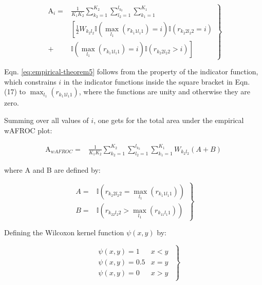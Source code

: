 \documentclass[
]{book}
\begin{document}
\begin{equation}
\left. 
\begin{aligned}
\text{A}_i =& \frac{1}{K_1K_2}  \sum_{k_2=1}^{K_2} \sum_{l_2=1}^{l_{k_2}}\sum_{k_1=1}^{K_1} \\
&\left [ \frac{1}{2} W_{k_2l_2} \mathbb{I}\left ( \max_{l_1} \left (r_{k_1 1 l_1 1}  \right ) = i  \right )\mathbb{I}\left ( r_{k_2 2 l_2 2} = i\right ) \right. \\
+& \left. \mathbb{I}\left ( \max_{l_1} \left (r_{k_1 1 l_1 1}  \right ) = i  \right )\mathbb{I}\left ( r_{k_2 2 l_2 2} > i \right )  \right ]
\end{aligned}
\right \} 
\label{eq:empirical-theorem5}
\end{equation}

Eqn. \eqref{eq:empirical-theorem5} follows from the property of the indicator function, which constrains \(i\) in the indicator functions inside the square bracket in Eqn. (17) to \(\max_{l_1} \left ( r_{k_1 1 l_1 1} \right )\), where the functions are unity and otherwise they are zero.

Summing over all values of \(i\), one gets for the total area under the empirical wAFROC plot:

\begin{equation}
\begin{aligned}
\text{A}_{wAFROC} =& \frac{1}{K_1K_2}  \sum_{k_2=1}^{K_2} \sum_{l_2=1}^{l_{k_2}}\sum_{k_1=1}^{K_1} W_{k_2l_2} \left( A+B \right)
\end{aligned}
\label{eq:empirical-theorem6}
\end{equation}

where A and B are defined by:

\begin{equation}
\left. 
\begin{aligned}
A =& \mathbb{I}\left ( r_{k_2 2l_2 2} = \max_{l_1} \left (r_{k_1 1l_1 1}  \right )  \right ) \\
B =& \mathbb{I}\left ( r_{k_22 l_2 2} > \max_{l_1} \left (r_{k_11 l_1 1}  \right )  \right )  
\end{aligned}
\right \} 
\label{eq:empirical-theorem6a}
\end{equation}

Defining the Wilcoxon kernel function \(\psi(x,y)\) by:

\begin{equation}
\left. 
\begin{matrix}
\begin{aligned}
&\psi\left( x,y \right) = 1 &  x < y\\
&\psi\left( x,y \right) = 0.5  & x = y \\
&\psi\left( x,y \right) = 0  & x > y
\end{aligned}
\end{matrix}
\right \} 
\label{eq:empirical-wilcoxon-kernel}
\end{equation}
\end{document}
